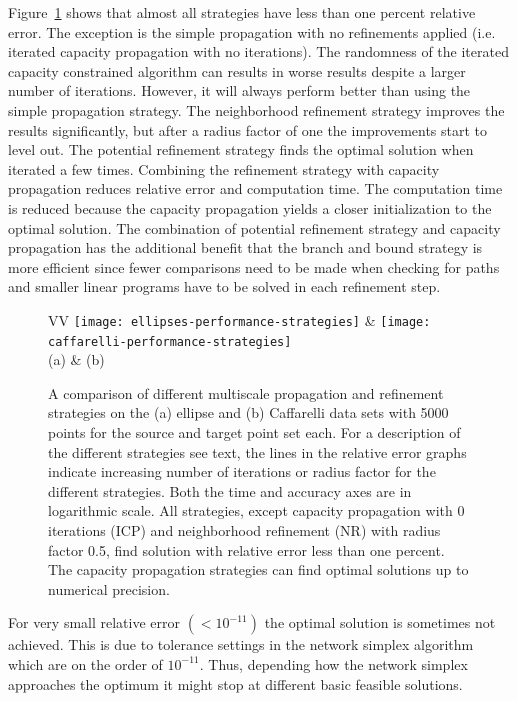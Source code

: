 \documentclass[twoside,11pt]{article}
\begin{document}
Figure~\ref{fig:strategies} shows that almost all strategies have less than one
percent relative error. The exception is the simple propagation with no
refinements applied (i.e. iterated capacity propagation with no iterations).
The randomness of the iterated capacity constrained algorithm can results in worse
results despite a larger number of iterations. However, it will always perform better than
using the simple propagation strategy.  The neighborhood refinement strategy
improves the results significantly, but after a radius factor of one the improvements start to
level out.  The potential refinement strategy finds the optimal solution when
iterated a few times.  Combining the refinement strategy with capacity
propagation reduces relative error and computation time.  The computation time
is reduced because the capacity propagation yields a closer initialization to
the optimal solution. The combination of potential refinement strategy and capacity propagation has
the additional benefit that the branch and bound strategy is more efficient
since fewer comparisons need to be made when checking for paths and smaller
linear programs have to be solved in each refinement step.
\begin{figure}[htb]
\centering
\begin{tabular}{VV}
\texttt{[image: ellipses-performance-strategies]} &
\texttt{[image: caffarelli-performance-strategies]} \\
                      (a) & (b)  
\end{tabular}
  \vspace{-0.15in}
\caption{
\label{fig:strategies}
A comparison of different multiscale propagation and refinement strategies on
the (a) ellipse and (b) Caffarelli data sets with 5000 points for the source and
target point set each. For a description of the different strategies see text,
the lines in the relative error graphs indicate increasing number of iterations
or radius factor for the different strategies.  Both the time and accuracy axes
are in logarithmic scale. All strategies, except capacity propagation with $0$
iterations (ICP) and neighborhood refinement (NR) with radius factor 0.5, find
solution with relative error less than one percent. The capacity propagation
strategies can find optimal solutions up to numerical precision.} 
\end{figure}
  \vspace{-0.15in}
For very small relative error $( < 10^{-11} )$ the optimal solution is
sometimes not achieved. This is due to tolerance settings in the network
simplex algorithm which are on the order of $10^{-11}$. Thus, depending how the
network simplex approaches the optimum it might stop at different basic
feasible solutions.  
\end{document}
